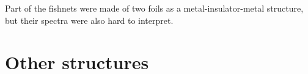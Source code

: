 Part of the fishnets were made of two foils as a metal-insulator-metal structure, but their spectra were also hard to interpret.








\FloatBarrier %
\section{Other structures} %
\cite{croenne2009controle}



% 



